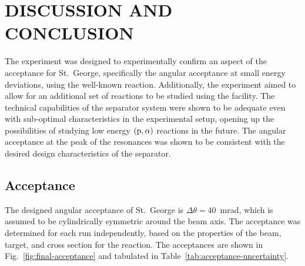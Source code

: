 \chapter{DISCUSSION AND CONCLUSION}
\label{ch:discussion-and-conclusion}

The experiment was designed to experimentally confirm an aspect of the
acceptance for St.\ George, specifically the angular acceptance at small
energy deviations, using the well-known \alpa{} reaction. Additionally,
the experiment aimed to allow for an additional set of reactions to be
studied using the facility. The technical capabilities of the separator
system were shown to be adequate even with sub-optimal characteristics
in the experimental setup, opening up the possibilities of studying low
energy $({\rm p},\alpha)$ reactions in the future. The angular
acceptance at the peak of the resonances was shown to be consistent with
the desired design characteristics of the separator.


\section{Acceptance}

The designed angular acceptance of St.\ George is $\Delta\theta =
40$~mrad, which is assumed to be cylindrically symmetric around the beam
axis. The acceptance was determined for each run independently, based on
the properties of the beam, target, and cross section for the \alpa{}
reaction. The acceptances are shown in Fig.~\ref{fig:final-acceptance}
and tabulated in Table~\ref{tab:acceptance-uncertainty}.

